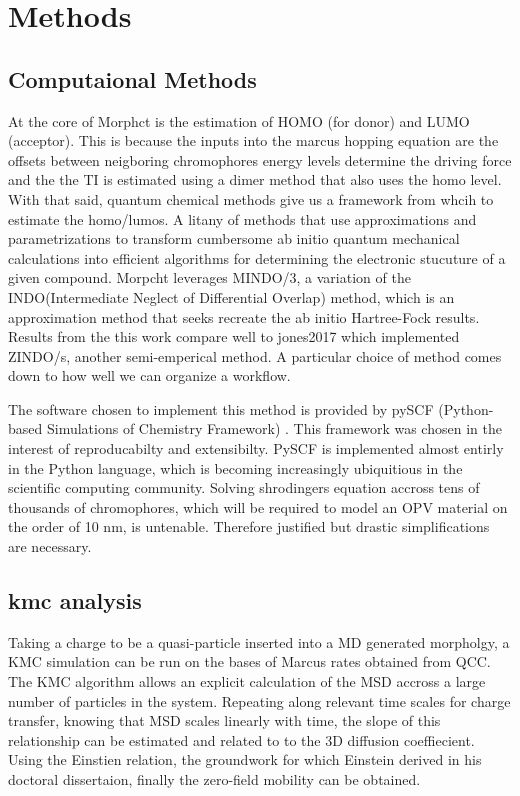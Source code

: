 \chapter{Methods}
\label{chap:methods}


\section{Computaional Methods}

At the core of Morphct is the estimation of HOMO (for donor) and LUMO (acceptor). This is because 
the inputs into the marcus hopping equation are the offsets between neigboring  chromophores energy levels
determine the driving force and the the TI is estimated using a dimer method that also uses the homo level. 
With that said, quantum chemical methods give us a framework from whcih to estimate the homo/lumos. A litany of
methods that use approximations and parametrizations to transform cumbersome ab initio quantum mechanical 
calculations into efficient algorithms for determining the electronic stucuture of a given compound. Morpcht 
leverages MINDO/3, a variation of the INDO(Intermediate Neglect of Differential Overlap) method,
which is an approximation method that seeks recreate the ab initio Hartree-Fock results\cite{Thiel2014}. Results
from the this work compare well to jones2017 which implemented ZINDO/s, another semi-emperical method. A particular 
choice of method comes down to how well we can organize a workflow. 

\indent The software chosen to implement this method is
provided by pySCF (Python-based Simulations of Chemistry Framework) \cite{Sun2018a}. This framework
was chosen in the interest of reproducabilty and extensibilty. PySCF is implemented almost entirly in the Python 
language, which is becoming increasingly ubiquitious in the scientific computing community.
Solving shrodingers equation accross tens of thousands of 
chromophores, which will be required to model an OPV material on the order of 10 nm, is untenable. Therefore
justified but drastic simplifications are necessary. 

\section{\nobreak kmc analysis}
Taking a charge to be a quasi-particle inserted into a MD generated morpholgy, a KMC
simulation can be run on the bases of Marcus rates obtained from QCC.
The KMC algorithm allows an explicit calculation of the MSD accross a large number of 
particles in the system. Repeating along relevant time scales for 
charge transfer, knowing that MSD scales linearly with time, the slope of this relationship
can be estimated and related to to the 3D diffusion coeffiecient. Using the Einstien relation, 
the groundwork for which Einstein derived in his doctoral dissertaion, finally the zero-field
mobility can be obtained. 


